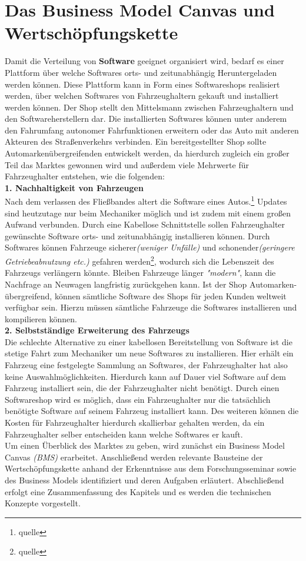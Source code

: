 \section{Das Business Model Canvas und Wertschöpfungskette}\label{markt}
Damit die Verteilung von \textbf{Software} geeignet organisiert wird, bedarf es einer Plattform über welche Softwares orts- und zeitunabhängig Heruntergeladen werden können. Diese Plattform kann in Form eines Softwareshops realisiert werden, über welchen Softwares von Fahrzeughaltern gekauft und installiert werden können. Der Shop stellt den Mittelsmann zwischen Fahrzeughaltern und den Softwareherstellern dar. Die installierten Softwares können unter anderem den Fahrumfang autonomer Fahrfunktionen erweitern oder das Auto mit anderen Akteuren des Straßenverkehrs verbinden. Ein bereitgestellter Shop sollte Automarkenübergreifenden entwickelt werden, da hierdurch zugleich ein großer Teil das Marktes gewonnen wird und außerdem viele Mehrwerte für Fahrzeughalter entstehen, wie die folgenden:\\

\textbf{1. Nachhaltigkeit von Fahrzeugen}\\
Nach dem verlassen des Fließbandes altert die Software eines Autos.\footnote{quelle} Updates sind heutzutage nur beim Mechaniker möglich und ist zudem mit einem großen Aufwand verbunden. Durch eine Kabellose Schnittstelle sollen Fahrzeughalter gewünschte Software orts- und zeitunabhängig installieren können. Durch Softwares können Fahrzeuge sicherer\textit{(weniger Unfälle)} und schonender\textit{(geringere Getriebeabnutzung etc.)} gefahren werden\footnote{quelle}, wodurch sich die Lebenszeit des Fahrzeugs verlängern könnte. Bleiben Fahrzeuge länger \textit{"modern"}, kann die Nachfrage an Neuwagen langfristig zurückgehen kann. Ist der Shop Automarken-übergreifend, können sämtliche Software des Shops für jeden Kunden weltweit verfügbar sein. Hierzu müssen sämtliche Fahrzeuge die Softwares installieren und kompilieren können.\\


\textbf{2. Selbstständige Erweiterung des Fahrzeugs}\\
Die schlechte Alternative zu einer kabellosen Bereitstellung von Software ist die stetige Fahrt zum Mechaniker um neue Softwares zu installieren. Hier erhält ein Fahrzeug eine festgelegte Sammlung an Softwares, der Fahrzeughalter hat also keine Auswahlmöglichkeiten. Hierdurch kann auf Dauer viel Software auf dem Fahrzeug installiert sein, die der Fahrzeughalter nicht benötigt. Durch einen Softwareshop wird es möglich, dass ein Fahrzeughalter nur die tatsächlich benötigte Software auf seinem Fahrzeug installiert kann. Des weiteren können die Kosten für Fahrzeughalter hierdurch skallierbar gehalten werden, da ein Fahrzeughalter selber entscheiden kann welche Softwares er kauft.\\

Um einen Überblick des Marktes zu geben, wird zunächst ein Business Model Canvas \textit{(BMS)} erarbeitet. Anschließend werden relevante Bausteine der Wertschöpfungskette anhand der Erkenntnisse aus dem Forschungsseminar sowie des Business Models identifiziert und deren Aufgaben erläutert. Abschließend erfolgt eine Zusammenfassung des Kapitels und es werden die technischen Konzepte vorgestellt.